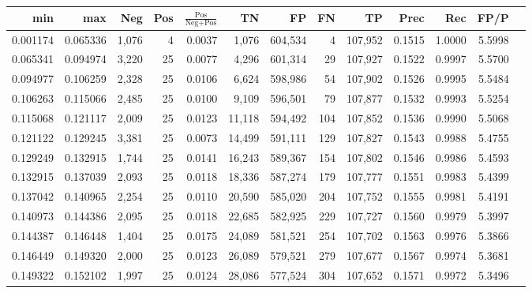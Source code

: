 \begin{tabular}{rrrrrrrrrrrrr}
\toprule
     min &      max &   Neg & Pos & $\frac{\text{Pos}}{\text{Neg}+\text{Pos}}$ &      TN &      FP &      FN &      TP &   Prec &    Rec &   FP/P \\
\midrule
0.001174 & 0.065336 & 1,076 &   4 &                                     0.0037 &   1,076 & 604,534 &       4 & 107,952 & 0.1515 & 1.0000 & 5.5998 \\
0.065341 & 0.094974 & 3,220 &  25 &                                     0.0077 &   4,296 & 601,314 &      29 & 107,927 & 0.1522 & 0.9997 & 5.5700 \\
0.094977 & 0.106259 & 2,328 &  25 &                                     0.0106 &   6,624 & 598,986 &      54 & 107,902 & 0.1526 & 0.9995 & 5.5484 \\
0.106263 & 0.115066 & 2,485 &  25 &                                     0.0100 &   9,109 & 596,501 &      79 & 107,877 & 0.1532 & 0.9993 & 5.5254 \\
0.115068 & 0.121117 & 2,009 &  25 &                                     0.0123 &  11,118 & 594,492 &     104 & 107,852 & 0.1536 & 0.9990 & 5.5068 \\
0.121122 & 0.129245 & 3,381 &  25 &                                     0.0073 &  14,499 & 591,111 &     129 & 107,827 & 0.1543 & 0.9988 & 5.4755 \\
0.129249 & 0.132915 & 1,744 &  25 &                                     0.0141 &  16,243 & 589,367 &     154 & 107,802 & 0.1546 & 0.9986 & 5.4593 \\
0.132915 & 0.137039 & 2,093 &  25 &                                     0.0118 &  18,336 & 587,274 &     179 & 107,777 & 0.1551 & 0.9983 & 5.4399 \\
0.137042 & 0.140965 & 2,254 &  25 &                                     0.0110 &  20,590 & 585,020 &     204 & 107,752 & 0.1555 & 0.9981 & 5.4191 \\
0.140973 & 0.144386 & 2,095 &  25 &                                     0.0118 &  22,685 & 582,925 &     229 & 107,727 & 0.1560 & 0.9979 & 5.3997 \\
0.144387 & 0.146448 & 1,404 &  25 &                                     0.0175 &  24,089 & 581,521 &     254 & 107,702 & 0.1563 & 0.9976 & 5.3866 \\
0.146449 & 0.149320 & 2,000 &  25 &                                     0.0123 &  26,089 & 579,521 &     279 & 107,677 & 0.1567 & 0.9974 & 5.3681 \\
0.149322 & 0.152102 & 1,997 &  25 &                                     0.0124 &  28,086 & 577,524 &     304 & 107,652 & 0.1571 & 0.9972 & 5.3496 \\

\end{tabular}
